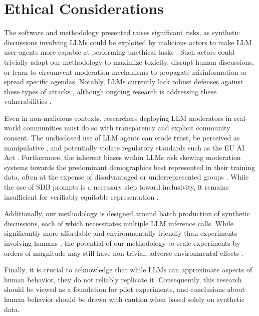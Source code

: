 %
\section{Ethical Considerations}
\label{sec:ethical}

The software and methodology presented raises significant risks, as synthetic discussions involving \acp{LLM} could be exploited by malicious actors to make \ac{LLM} user-agents more capable at performing unethical tasks \cite{majumdar_2024_nefarious, MARULLI20245340}. Such actors could trivially adapt our methodology to  maximize toxicity, disrupt human discussions, or learn to circumvent moderation mechanisms to propagate misinformation or spread specific agendas. Notably, \acp{LLM} currently lack robust defenses against these types of attacks \cite{li_2025_vulnerable}, although ongoing research is addressing these vulnerabilities \cite{wang_2025_risk}.

Even in non-malicious contexts, researchers deploying \ac{LLM} moderators in real-world communities must do so with transparency and explicit community consent. The undisclosed use of \ac{LLM} agents can erode trust, be perceived as manipulative \cite{retraction_watch}, and potentially violate regulatory standards such as the EU AI Act \cite{eu_ai_act_2024}. Furthermore, the inherent biases within \acp{LLM} risk skewing moderation systems towards the predominant demographics best represented in their training data, often at the expense of disadvantaged or underrepresented groups \cite{rossi_2024, anthis_2025, burton2024large}. While the use of \ac{SDB} prompts is a necessary step toward inclusivity, it remains insufficient for verifiably equitable representation \cite{rossi_2024}.

Additionally, our methodology is designed around batch production of synthetic discussions, each of which necessitates multiple \ac{LLM} inference calls. While significantly more affordable and environmentally friendly than experiments involving humans \cite{Ren2024}, the potential of our methodology to scale experiments by orders of magnitude may still have non-trivial, adverse environmental effects \cite{ding_2024_sustainable}. 

Finally, it is crucial to acknowledge that while \acp{LLM} can approximate aspects of human behavior, they do not reliably replicate it. Consequently, this research should be viewed as a foundation for pilot experiments, and conclusions about human behavior should be drawn with caution when based solely on synthetic data.